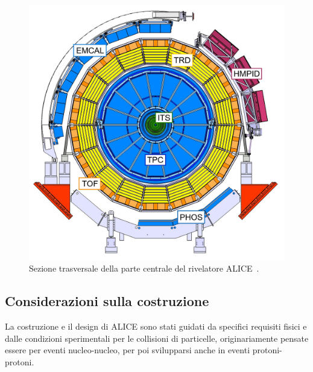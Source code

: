 \newpage

    \begin{figure}[t]
        \centering
        \includegraphics[width=0.6\linewidth]{res/fig/2-chapter/3-ALICE-detector-center.jpg}
        \caption{Sezione trasversale della parte centrale del rivelatore ALICE~\cite{Gagliardi_2019}.}
        \label{fig:2-3-ALICE-detector-center}
    \end{figure}

    \subsection{Considerazioni sulla costruzione}
        La costruzione e il design di ALICE sono stati guidati da specifici requisiti fisici e dalle condizioni sperimentali per le collisioni di particelle, originariamente pensate essere per eventi nucleo-nucleo, per poi svilupparsi anche in eventi protoni-protoni.

